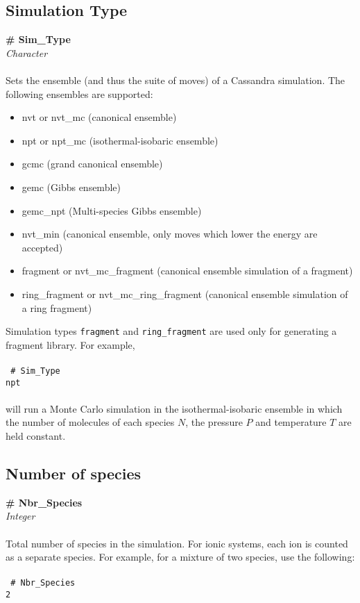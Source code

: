 %
%
%
\subsection{Simulation Type}\label{sec:Sim_Type}

{\bf \# Sim\_Type} \\
{\it Character} \\ \\
%
Sets the ensemble (and thus the suite of moves) of a Cassandra simulation. 
The following ensembles are supported: \\
\begin{itemize}
\item nvt or nvt\_mc (canonical ensemble)
\item npt or npt\_mc (isothermal-isobaric ensemble)
\item gcmc (grand canonical ensemble)
\item gemc (Gibbs ensemble)
\item gemc\_npt (Multi-species Gibbs ensemble)
\item nvt\_min (canonical ensemble, only moves which lower the energy are accepted)
\item fragment or nvt\_mc\_fragment (canonical ensemble simulation of a fragment)
\item ring\_fragment or nvt\_mc\_ring\_fragment (canonical ensemble simulation of a ring fragment)
\end{itemize} 
Simulation types {\tt fragment} and  {\tt ring\_fragment} are 
used only for generating a fragment library.
For example, \\ \\
\texttt{
\# Sim\_Type \\
npt \\ \\
}
%
will run a Monte Carlo simulation in the isothermal-isobaric ensemble in which the number of 
molecules of each species $N$, the pressure $P$ and temperature $T$ are held constant.
%
%
%
\subsection{Number of species}\label{sec:Nbr_Species} 
{\bf \# Nbr\_Species} \\
{\it Integer} \\ \\
%
Total number of species in the simulation. For ionic systems, each ion
is counted as a separate species. For example, for a mixture of two
species, use the following: \\  \\
%
\texttt{
\# Nbr\_Species \\
2 
}
%
%
%
